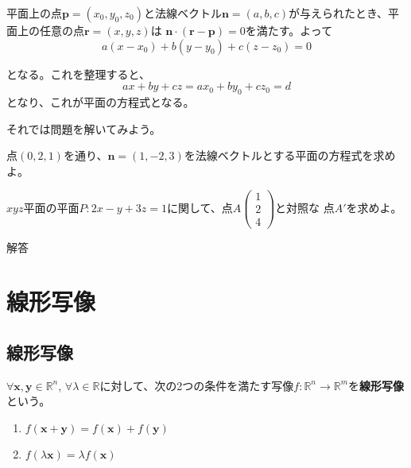 \documentclass{jlreq}
\begin{document}
\begin{theorembox}[平面の方程式]
  平面上の点$\boldsymbol{p} = (x_0, y_0, z_0)$と法線ベクトル$\boldsymbol{n} = (a, b, c)$が与えられたとき、平面上の任意の点$\boldsymbol{r} = (x, y, z)$は
  $\boldsymbol{n} \cdot (\boldsymbol{r} - \boldsymbol{p}) = 0$を満たす。よって
  \begin{equation*}
    a(x - x_0) + b(y - y_0) + c(z - z_0) = 0
  \end{equation*}

  となる。これを整理すると、
  \begin{equation*}
    ax + by + cz = a x_0 + b y_0 + c z_0 = d
  \end{equation*}
   となり、これが平面の方程式となる。
\end{theorembox}

それでは問題を解いてみよう。

\begin{problem}
  点$(0, 2, 1)$を通り、$\boldsymbol{n} = (1, -2, 3)$を法線ベクトルとする平面の方程式を求めよ。
\end{problem}

\begin{problem}
  $xyz$平面の平面$P: 2x - y + 3z = 1$に関して、点$A \begin{pmatrix} 1 \\ 2 \\ 4 \end{pmatrix}$と対照な
  点$A'$を求めよ。

  \dotfill
  解答 \\
  
\end{problem}

\section{線形写像}

\subsection{線形写像}
\begin{definitionbox}[線形写像]
  $\forall \boldsymbol{x}, \boldsymbol{y} \in \mathbb{R}^n$, $\forall \lambda \in \mathbb{R}$に対して、次の2つの条件を満たす写像$f: \mathbb{R}^n \to \mathbb{R}^m$を\textbf{線形写像}という。

  \begin{enumerate}
    \item $f(\boldsymbol{x} + \boldsymbol{y}) = f(\boldsymbol{x}) + f(\boldsymbol{y})$
    \item $f(\lambda \boldsymbol{x}) = \lambda f(\boldsymbol{x})$
  \end{enumerate}
\end{definitionbox}
\end{document}
